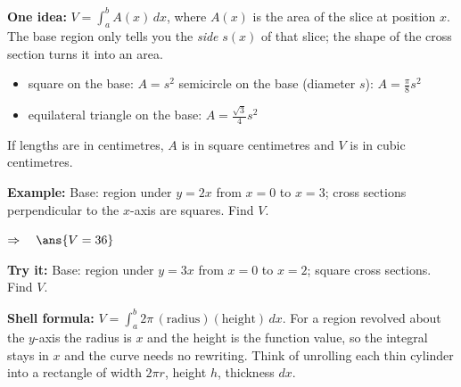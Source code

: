\documentclass[12pt]{article}
\begin{document}


\begin{formulabox}
\textbf{One idea:} $V = \displaystyle\int_a^b A(x)\,dx$, where $A(x)$ is the area of the slice at position $x$. The base region only tells you the \emph{side} $s(x)$ of that slice; the shape of the cross section turns it into an area.
\begin{itemize}[leftmargin=1.2cm, itemsep=1pt, topsep=2pt]
  \item square on the base: $A = s^2$ \qquad semicircle on the base (diameter $s$): $A = \tfrac{\pi}{8}s^2$
  \item equilateral triangle on the base: $A = \tfrac{\sqrt{3}}{4}s^2$
\end{itemize}
If lengths are in centimetres, $A$ is in square centimetres and $V$ is in cubic centimetres.
\end{formulabox}

\begin{examplebox}
\textbf{Example:} \quad Base: region under $y = 2x$ from $x = 0$ to $x = 3$; cross sections perpendicular to the $x$-axis are squares. Find $V$.

$\Rightarrow\quad \ans{V = 36}$
\end{examplebox}

\begin{tryitbox}
\textbf{Try it:} \quad Base: region under $y = 3x$ from $x = 0$ to $x = 2$; square cross sections. Find $V$.\\[2pt]
\end{tryitbox}


\begin{formulabox}
\textbf{Shell formula:} $V = \displaystyle\int_a^b 2\pi\,(\text{radius})(\text{height})\,dx$. For a region revolved about the $y$-axis the radius is $x$ and the height is the function value, so the integral stays in $x$ and the curve needs no rewriting. Think of unrolling each thin cylinder into a rectangle of width $2\pi r$, height $h$, thickness $dx$.
\end{formulabox}
\end{document}
